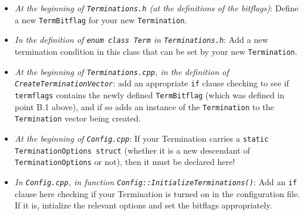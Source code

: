 \documentclass[11pt,a4paper]{article}
\newcommand{\code}[1]{{\tt #1}}
\begin{document}
\begin{itemize}
 \item[B.1.] \emph{At the beginning of \code{Terminations.h} (at the definitions of the bitflags)}: Define a new \code{TermBitflag} for your new \code{Termination}.
 \item[B.2.] \emph{In the definition of \code{enum class Term} in \code{Terminations.h}}: Add a new termination condition in this class that can be set by your new \code{Termination}.
 
  \item[C.] \emph{At the beginning of \code{Terminations.cpp}, in the definition of \code{CreateTerminationVector}}: add an appropriate \code{if} clause checking to see if \code{termflags} contains the newly defined \code{TermBitflag} (which was defined in point B.1 above), and if so adds an instance of the \code{Termination} to the \code{Termination} vector being created.
  
  \item[D.1.] \emph{At the beginning of \code{Config.cpp}}: If your Termination carries a \code{static TerminationOptions struct} (whether it is a new descendant of \code{TerminationOptions} or not), then it must be declared here!
  
   \item[D.2.] \emph{In \code{Config.cpp}, in function \code{Config::InitializeTerminations()}}: Add an \code{if} clause here checking if your Termination is turned on in the configuration file. If it is, intialize the relevant options and set the bitflags appropriately.

 
\end{itemize}
\end{document}
